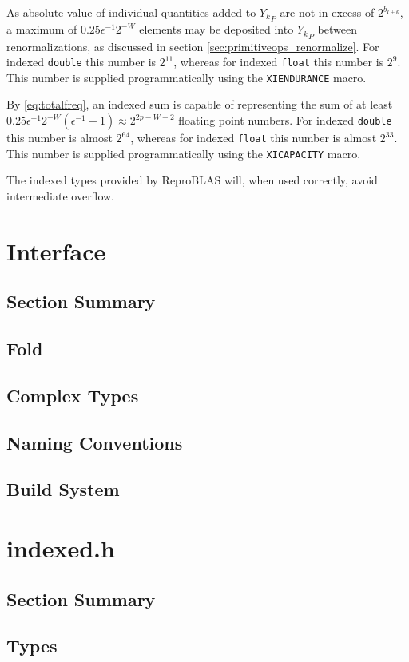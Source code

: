 \documentclass[12pt]{article}
\theoremstyle{definition}
\numberwithin{equation}{section}
\numberwithin{figure}{section}
\begin{document}
    As absolute value of individual quantities added to ${Y_k}_P$ are not in excess of $2^{b_{I + k}}$, a maximum of $0.25\epsilon^{-1}2^{-W}$ elements may be deposited into ${Y_k}_P$ between renormalizations, as discussed in section \ref{sec:primitiveops_renormalize}. For indexed \texttt{double} this number is $2^{11}$, whereas for indexed \texttt{float} this number is $2^9$. This number is supplied programmatically using the \texttt{XIENDURANCE} macro.

    By \eqref{eq:totalfreq}, an indexed sum is capable of representing the sum of at least $0.25\epsilon^{-1}2^{-W}  (\epsilon^{-1} - 1) \approx 2^{2  p - W - 2}$ floating point numbers. For indexed \texttt{double} this number is almost $2^{64}$, whereas for indexed \texttt{float} this number is almost $2^{33}$. This number is supplied programmatically using the \texttt{XICAPACITY} macro.

    The indexed types provided by ReproBLAS will, when used correctly, avoid intermediate overflow.

\section{Interface}
  \subsection{Section Summary}
  \subsection{Fold}
  \subsection{Complex Types}
  \subsection{Naming Conventions}
  \subsection{Build System}
\section{indexed.h}
  \subsection{Section Summary}
  \subsection{Types}
\end{document}
